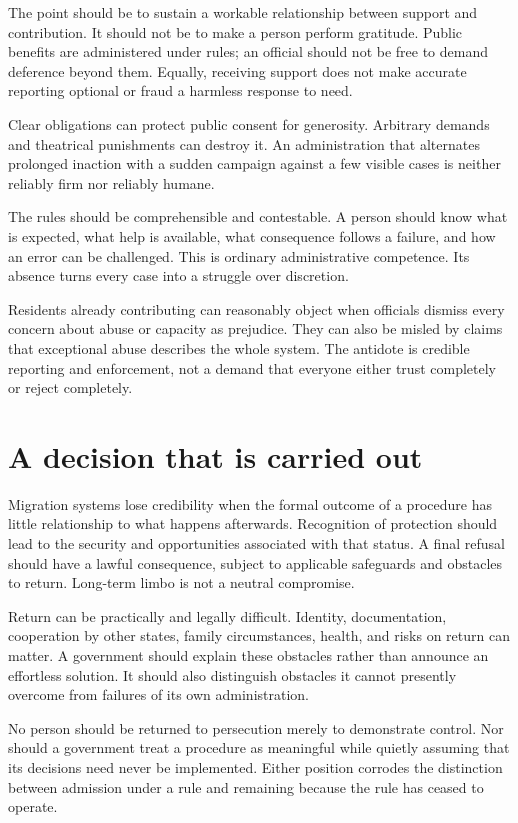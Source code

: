 \documentclass[12pt,a4paper]{book}
\begin{document}
The point should be to sustain a workable relationship between support and contribution. It should not be to make a person perform gratitude. Public benefits are administered under rules; an official should not be free to demand deference beyond them. Equally, receiving support does not make accurate reporting optional or fraud a harmless response to need.

Clear obligations can protect public consent for generosity. Arbitrary demands and theatrical punishments can destroy it. An administration that alternates prolonged inaction with a sudden campaign against a few visible cases is neither reliably firm nor reliably humane.

The rules should be comprehensible and contestable. A person should know what is expected, what help is available, what consequence follows a failure, and how an error can be challenged. This is ordinary administrative competence. Its absence turns every case into a struggle over discretion.

Residents already contributing can reasonably object when officials dismiss every concern about abuse or capacity as prejudice. They can also be misled by claims that exceptional abuse describes the whole system. The antidote is credible reporting and enforcement, not a demand that everyone either trust completely or reject completely.

\section*{A decision that is carried out}

Migration systems lose credibility when the formal outcome of a procedure has little relationship to what happens afterwards. Recognition of protection should lead to the security and opportunities associated with that status. A final refusal should have a lawful consequence, subject to applicable safeguards and obstacles to return. Long-term limbo is not a neutral compromise.

Return can be practically and legally difficult. Identity, documentation, cooperation by other states, family circumstances, health, and risks on return can matter. A government should explain these obstacles rather than announce an effortless solution. It should also distinguish obstacles it cannot presently overcome from failures of its own administration.

No person should be returned to persecution merely to demonstrate control. Nor should a government treat a procedure as meaningful while quietly assuming that its decisions need never be implemented. Either position corrodes the distinction between admission under a rule and remaining because the rule has ceased to operate.
\end{document}
